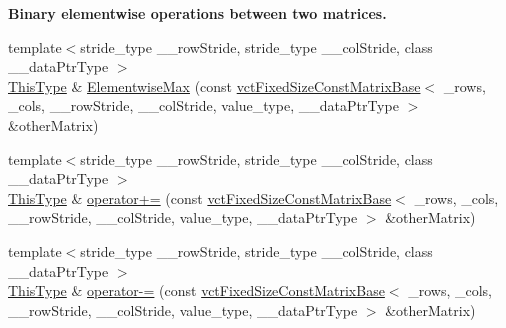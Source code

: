 \begin{Indent}{\bf Binary elementwise operations between two matrices.}
\begin{DoxyCompactItemize}
\item 
{\footnotesize template$<$stride\-\_\-type \-\_\-\-\_\-row\-Stride, stride\-\_\-type \-\_\-\-\_\-col\-Stride, class \-\_\-\-\_\-data\-Ptr\-Type $>$ }\\\hyperlink{classvct_fixed_size_const_matrix_base_a7ec66a96ed7e08ce9ff54093133c9d8d}{This\-Type} \& \hyperlink{classvct_fixed_size_matrix_base_afc8bc0b07805adda8da3034388031c7f}{Elementwise\-Max} (const \hyperlink{classvct_fixed_size_const_matrix_base}{vct\-Fixed\-Size\-Const\-Matrix\-Base}$<$ \-\_\-rows, \-\_\-cols, \-\_\-\-\_\-row\-Stride, \-\_\-\-\_\-col\-Stride, value\-\_\-type, \-\_\-\-\_\-data\-Ptr\-Type $>$ \&other\-Matrix)
\item 
{\footnotesize template$<$stride\-\_\-type \-\_\-\-\_\-row\-Stride, stride\-\_\-type \-\_\-\-\_\-col\-Stride, class \-\_\-\-\_\-data\-Ptr\-Type $>$ }\\\hyperlink{classvct_fixed_size_const_matrix_base_a7ec66a96ed7e08ce9ff54093133c9d8d}{This\-Type} \& \hyperlink{classvct_fixed_size_matrix_base_a481eb2dec5b3cb9cf52a5be02cc6504d}{operator+=} (const \hyperlink{classvct_fixed_size_const_matrix_base}{vct\-Fixed\-Size\-Const\-Matrix\-Base}$<$ \-\_\-rows, \-\_\-cols, \-\_\-\-\_\-row\-Stride, \-\_\-\-\_\-col\-Stride, value\-\_\-type, \-\_\-\-\_\-data\-Ptr\-Type $>$ \&other\-Matrix)
\item 
{\footnotesize template$<$stride\-\_\-type \-\_\-\-\_\-row\-Stride, stride\-\_\-type \-\_\-\-\_\-col\-Stride, class \-\_\-\-\_\-data\-Ptr\-Type $>$ }\\\hyperlink{classvct_fixed_size_const_matrix_base_a7ec66a96ed7e08ce9ff54093133c9d8d}{This\-Type} \& \hyperlink{classvct_fixed_size_matrix_base_a412c8075ed71b4feea3b5d28ffb49eee}{operator-\/=} (const \hyperlink{classvct_fixed_size_const_matrix_base}{vct\-Fixed\-Size\-Const\-Matrix\-Base}$<$ \-\_\-rows, \-\_\-cols, \-\_\-\-\_\-row\-Stride, \-\_\-\-\_\-col\-Stride, value\-\_\-type, \-\_\-\-\_\-data\-Ptr\-Type $>$ \&other\-Matrix)
\end{DoxyCompactItemize}
\end{Indent}
